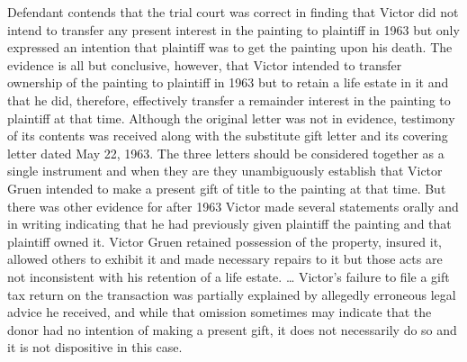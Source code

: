 Defendant contends that the trial court was correct in finding that Victor did
not intend to transfer any present interest in the painting to plaintiff in
1963 but only expressed an intention that plaintiff was to get the painting
upon his death. The evidence is all but conclusive, however, that Victor
intended to transfer ownership of the painting to plaintiff in 1963 but to
retain a life estate in it and that he did, therefore, effectively transfer a
remainder interest in the painting to plaintiff at that time. Although the
original letter was not in evidence, testimony of its contents was received
along with the substitute gift letter and its covering letter dated May 22,
1963. The three letters should be considered together as a single instrument
and when they are they unambiguously establish that Victor Gruen intended to
make a present gift of title to the painting at that time. But there was other
evidence for after 1963 Victor made several statements orally and in writing
indicating that he had previously given plaintiff the painting and that
plaintiff owned it. Victor Gruen retained possession of the property, insured
it, allowed others to exhibit it and made necessary repairs to it but those
acts are not inconsistent with his retention of a life estate. \dots{} Victor's
failure to file a gift tax return on the transaction was partially explained by
allegedly erroneous legal advice he received, and while that omission sometimes
may indicate that the donor had no intention of making a present gift, it does
not necessarily do so and it is not dispositive in this case. 

